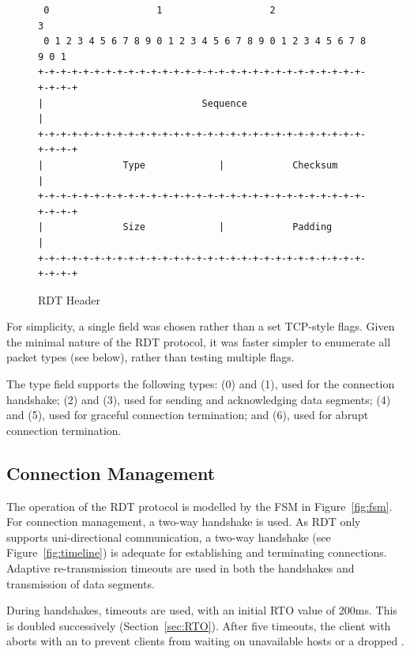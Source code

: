 \begin{figure}
\begin{center}
\begin{verbatim}
 0                   1                   2                   3  
 0 1 2 3 4 5 6 7 8 9 0 1 2 3 4 5 6 7 8 9 0 1 2 3 4 5 6 7 8 9 0 1
+-+-+-+-+-+-+-+-+-+-+-+-+-+-+-+-+-+-+-+-+-+-+-+-+-+-+-+-+-+-+-+-+
|                            Sequence                           |
+-+-+-+-+-+-+-+-+-+-+-+-+-+-+-+-+-+-+-+-+-+-+-+-+-+-+-+-+-+-+-+-+
|              Type             |            Checksum           |
+-+-+-+-+-+-+-+-+-+-+-+-+-+-+-+-+-+-+-+-+-+-+-+-+-+-+-+-+-+-+-+-+
|              Size             |            Padding            |
+-+-+-+-+-+-+-+-+-+-+-+-+-+-+-+-+-+-+-+-+-+-+-+-+-+-+-+-+-+-+-+-+
\end{verbatim}
\end{center}
\caption{RDT Header}\label{fig:header}
\end{figure}

For simplicity, a single  field was chosen rather than a set TCP-style flags. Given the minimal nature of the RDT protocol, it was faster simpler to enumerate all packet types (see below), rather than testing multiple flags.

The type field supports the following types:  (0) and  (1), used for the connection handshake;  (2) and  (3), used for sending and acknowledging data segments;  (4) and  (5), used for graceful connection termination; and  (6), used for abrupt connection termination.

\subsection{Connection Management}

The operation of the RDT protocol is modelled by the FSM in Figure~\ref{fig:fsm}. For connection management, a two-way handshake is used. As RDT only supports uni-directional communication, a two-way handshake (see Figure~\ref{fig:timeline}) is adequate for establishing and terminating connections. Adaptive re-transmission timeouts are used in both the handshakes and transmission of data segments.

During handshakes, timeouts are used, with an initial RTO value of 200ms. This is doubled successively (Section~\ref{sec:RTO}). After five timeouts, the client with aborts with an  to prevent clients from waiting on unavailable hosts or a dropped .

